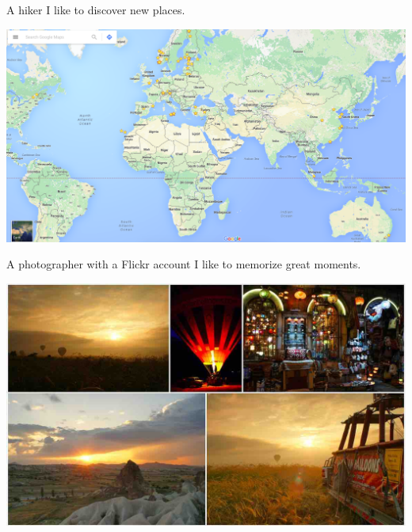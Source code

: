 \documentclass[first=dgreen,second=purple,logo=yellowexc]{aaltoslides}
\begin{document}
\begin{frame}{A hiker}
	I like to discover new places.
	\begin{center}
		\includegraphics[scale=0.22,angle=-0,origin=c]{./plots/googlemap.png}
	\end{center}
\end{frame}

\begin{frame}{A photographer with a Flickr account}
	I like to memorize great moments.
	\begin{center}
		\includegraphics[scale=0.25,angle=-0,origin=c]{./plots/flickr.jpg}
	\end{center}
\end{frame}
\end{document}
